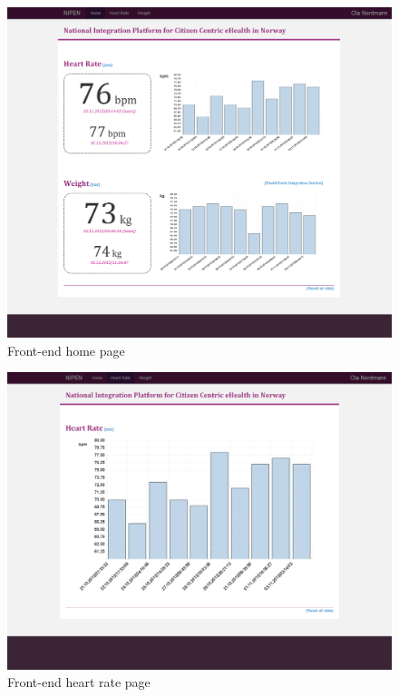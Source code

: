 \begin{figure}[H]
\centering
\includegraphics[scale=0.4]{../Figures/frontend-main-page.png}
\caption{Front-end home page}
\label{figure:frontend-main-page}
\end{figure}

\begin{figure}[H]
\centering
\includegraphics[scale=0.4]{../Figures/frontend-heart-rate-page.png}
\caption{Front-end heart rate page}
\label{figure:frontend-heart-rate-page}
\end{figure}

